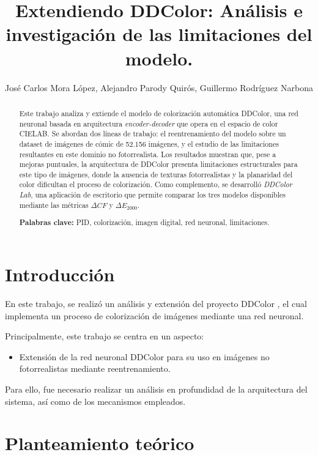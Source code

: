 \documentclass[a4paper]{article}
\title{Extendiendo DDColor: Análisis e 
investigación de las limitaciones del modelo.}
\author{José Carlos Mora López, Alejandro Parody Quirós, Guillermo Rodríguez Narbona}
\begin{document}
\maketitle

\begin{abstract}
\noindent Este trabajo analiza y extiende el modelo de colorización automática DDColor, una red neuronal basada en arquitectura \textit{encoder-decoder} que opera en el espacio de color CIELAB. Se abordan dos líneas de trabajo: el reentrenamiento del modelo sobre un dataset de imágenes de cómic de 52.156 imágenes, y el estudio de las limitaciones resultantes en este dominio no fotorrealista. Los resultados muestran que, pese a mejoras puntuales, la arquitectura de DDColor presenta limitaciones estructurales para este tipo de imágenes, donde la ausencia de texturas fotorrealistas y la planaridad del color dificultan el proceso de colorización. Como complemento, se desarrolló \textit{DDColor Lab}, una aplicación de escritorio que permite comparar los tres modelos disponibles mediante las métricas $\Delta CF$ y $\Delta E_{2000}$.

\hspace{1cm}

\noindent \textbf{Palabras clave:} 
PID, colorización, imagen digital, red neuronal, limitaciones.
\end{abstract}


\section{Introducción}

En este trabajo, se realizó un análisis y extensión del proyecto DDColor \cite{DDColor}, el cual implementa un proceso de colorización de imágenes mediante una red neuronal.

Principalmente, este trabajo se centra en un aspecto:

\begin{itemize}
  \item{Extensión de la red neuronal DDColor para su uso en imágenes no fotorrealistas mediante reentrenamiento.}
\end{itemize}

Para ello, fue necesario realizar un análisis en profundidad de la arquitectura del sistema, así como de los mecanismos empleados.

\section{Planteamiento teórico}
\end{document}
